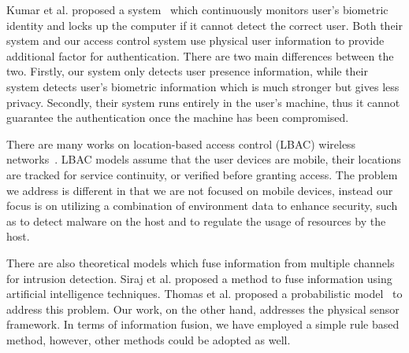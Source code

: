 Kumar et al. proposed a
system~\cite{kumar2005using,yap2008physical,kwang2009usability}
which continuously monitors
user's biometric identity and locks up the computer if it cannot detect
the correct user.
Both their system and our access control system use physical user
information to provide additional factor for authentication.
There are two main differences between the two.
Firstly, our system only detects user presence information, while
their system detects user's biometric information which is much
stronger but gives less privacy.
Secondly, their system runs entirely in the user's machine, thus
it cannot guarantee the authentication once the machine has been compromised.

There are many works on location-based access control (LBAC) 
wireless networks~\cite{ardagna2006supporting}. 
LBAC models assume that the user devices are mobile,
their locations are tracked for service continuity, or verified
before granting access.  The problem we address is different in that
we are not focused on mobile devices, instead our focus is on
utilizing a combination of environment data to enhance security,
such as to detect malware on the host and to regulate the usage of
resources by the host.

There are also theoretical models which fuse information from multiple channels
for intrusion detection.
Siraj et al. proposed a method \cite{siraj2004intrusion} to fuse information
using artificial intelligence techniques.
Thomas et al. proposed a probabilistic model~\cite{thomas2009improvement}
to address this problem.
Our work, on the other hand, addresses the physical sensor framework.
In terms of information fusion, we have employed
a simple rule based method, however, other methods could be adopted as well.
